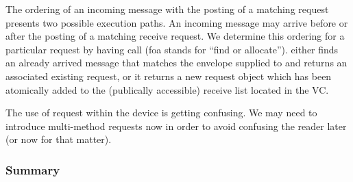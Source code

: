 The ordering of an incoming message with the posting of a matching request
presents two possible execution paths.  An incoming message may arrive before
or after the posting of a matching receive request.  We determine this ordering
for a particular request by having  call
 (foa stands for ``find or allocate'').
 either finds an already arrived message that matches
the envelope supplied to  and returns an associated existing
request, or it returns a new request object which has been atomically added to
the (publically accessible) receive list located in the VC.

\begin{cmt}
  The use of request within the device is getting confusing.  We may need to
  introduce multi-method requests now in order to avoid confusing the reader
  later (or now for that matter).
\end{cmt}







\subsubsection{Summary}



